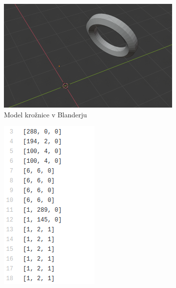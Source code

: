 \documentclass[a4paper,11pt]{article}
\begin{document}
    \begin{figure}[h!]
        \centering
        \begin{subfigure}[b]{0.4\linewidth}
          \includegraphics[width=\linewidth]{test_torus.png}
          \caption{Model krožnice v Blanderju}
        \end{subfigure}
        \begin{subfigure}[b]{0.2\linewidth}
          \includegraphics[width=\linewidth]{test_torus_betti.png}

\end{subfigure}
\end{figure}
\end{document}
